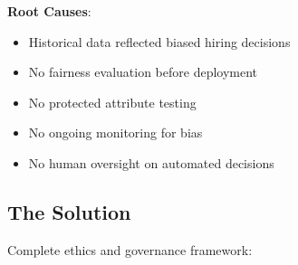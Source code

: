 \textbf{Root Causes}:
\begin{itemize}
    \item Historical data reflected biased hiring decisions
    \item No fairness evaluation before deployment
    \item No protected attribute testing
    \item No ongoing monitoring for bias
    \item No human oversight on automated decisions
\end{itemize}

\subsection{The Solution}

Complete ethics and governance framework:

